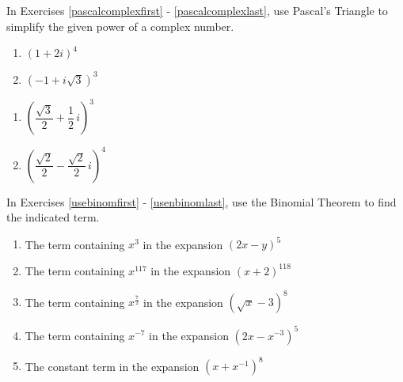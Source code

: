In Exercises \ref{pascalcomplexfirst} - \ref{pascalcomplexlast},   use Pascal's Triangle to simplify the given power of a complex number.

\begin{multicols}{2}
\begin{enumerate}
\setcounter{enumi}{\value{HW}}

\item  $(1+2i)^4$ \label{pascalcomplexfirst}

\item  $\left(-1 + i \sqrt{3}\right)^3$

\setcounter{HW}{\value{enumi}}
\end{enumerate}
\end{multicols}

\begin{multicols}{2}
\begin{enumerate}
\setcounter{enumi}{\value{HW}}

\item  $\left(\dfrac{\sqrt{3}}{2} +  \dfrac{1}{2}\, i\right)^3$

\item  $\left(\dfrac{\sqrt{2}}{2} - \dfrac{\sqrt{2}}{2} \, i\right)^4$  \label{pascalcomplexlast}

\setcounter{HW}{\value{enumi}}
\end{enumerate}
\end{multicols}

In Exercises \ref{usebinomfirst} - \ref{usenbinomlast}, use the Binomial Theorem to find the indicated term.

\begin{enumerate}
\setcounter{enumi}{\value{HW}}

\item  The term containing $x^3$ in the expansion $(2x-y)^{5}$ \label{usebinomfirst}

\item  The term containing $x^{117}$ in the expansion $(x+2)^{118}$

\item  The term containing $x^{\frac{7}{2}}$ in the expansion $\left(\sqrt{x}-3\right)^8$

\item  The term containing $x^{-7}$ in the expansion  $\left(2x - x^{-3} \right)^{5}$

\item  The constant term in the expansion $\left(x + x^{-1} \right)^{8}$ \label{usenbinomlast}

\setcounter{HW}{\value{enumi}}
\end{enumerate}

